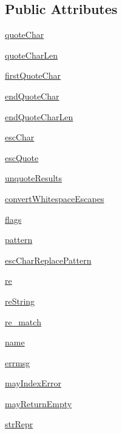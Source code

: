 \subsection*{Public Attributes}
\begin{DoxyCompactItemize}
\item 
\hyperlink{classpyparsing_1_1QuotedString_a69a9115cd85b4601b2402da6dc80224f}{quote\+Char}
\item 
\hyperlink{classpyparsing_1_1QuotedString_ac5891cf65344a6ee26aab2de9888061e}{quote\+Char\+Len}
\item 
\hyperlink{classpyparsing_1_1QuotedString_a3ec1e4e16863721ba8130b53cfe97a91}{first\+Quote\+Char}
\item 
\hyperlink{classpyparsing_1_1QuotedString_a020c579ce6fc0c72ddeb7f562ae065b4}{end\+Quote\+Char}
\item 
\hyperlink{classpyparsing_1_1QuotedString_aabdad5a4af0531ed1fe6b53ba4bef3f2}{end\+Quote\+Char\+Len}
\item 
\hyperlink{classpyparsing_1_1QuotedString_aa3070e527bcd7be8d54083ba9173ffa7}{esc\+Char}
\item 
\hyperlink{classpyparsing_1_1QuotedString_a02923940fe9ae44f43a43a1628e7d15e}{esc\+Quote}
\item 
\hyperlink{classpyparsing_1_1QuotedString_a599c2949fc7459408cdb1583312502e3}{unquote\+Results}
\item 
\hyperlink{classpyparsing_1_1QuotedString_af2d9d7db0dcb6af41ef8edeb72eb62fa}{convert\+Whitespace\+Escapes}
\item 
\hyperlink{classpyparsing_1_1QuotedString_a08f53e0159bfd41ea6e881564f38a112}{flags}
\item 
\hyperlink{classpyparsing_1_1QuotedString_a65074a9ec0525f3cbe102d3dfe3c0559}{pattern}
\item 
\hyperlink{classpyparsing_1_1QuotedString_a49cca844b865d1fe0686ac2febfab556}{esc\+Char\+Replace\+Pattern}
\item 
\hyperlink{classpyparsing_1_1QuotedString_a5d1bf7335413fc312b3d925706a67262}{re}
\item 
\hyperlink{classpyparsing_1_1QuotedString_aa8a46982796d41ed8beeb6bfbf735497}{re\+String}
\item 
\hyperlink{classpyparsing_1_1QuotedString_ace5213501575390e0c80d482764cb135}{re\+\_\+match}
\item 
\hyperlink{classpyparsing_1_1QuotedString_acbffa2066e87a9d4b99bbc86c86a9b45}{name}
\item 
\hyperlink{classpyparsing_1_1QuotedString_a17bb0f58496a5f8683627da33f016dce}{errmsg}
\item 
\hyperlink{classpyparsing_1_1QuotedString_a8c0ca2a6a97712f500731eb5c179ab95}{may\+Index\+Error}
\item 
\hyperlink{classpyparsing_1_1QuotedString_a71613b3f26e22bd91cec700776f9a348}{may\+Return\+Empty}
\item 
\hyperlink{classpyparsing_1_1QuotedString_a77eba8f668233482f476607da05bbba8}{str\+Repr}
\end{DoxyCompactItemize}
